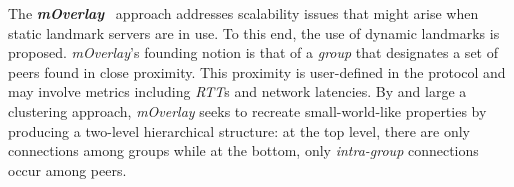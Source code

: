 The \textbf{\emph{mOverlay}}~\cite{ZZZSZ2004} approach addresses scalability issues
that might arise when static landmark servers are in use.
To this end, the use of dynamic landmarks is proposed.
\emph{mOverlay}'s founding notion is that of a \emph{group} that 
designates a set of peers found in close proximity.
This proximity is user-defined in the protocol and 
may involve metrics including \emph{RTT}s and network latencies.
By and large a clustering approach, \emph{mOverlay} seeks to 
recreate small-world-like properties by producing a 
two-level hierarchical structure:
at the top level, there are only connections among groups 
while at the bottom, only \emph{intra-group} connections occur among peers.

